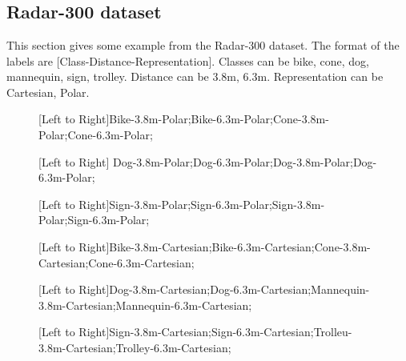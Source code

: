 \chapter{}

\section{Radar-300 dataset}\label{apa}
This section gives some example from the Radar-300 dataset. The format of the labels are [Class-Distance-Representation]. Classes can be {bike, cone, dog, mannequin, sign, trolley}. Distance can be {3.8m, 6.3m}. Representation can be {Cartesian, Polar}.

\begin{figure}[h]
	\centering
	\epsfxsize=7.5cm
	{}{}\caption{[Left to Right]Bike-3.8m-Polar;Bike-6.3m-Polar;Cone-3.8m-Polar;Cone-6.3m-Polar;}
	\label{fig:blocks}
\end{figure} 

\begin{figure}[h]
	\centering
	\epsfxsize=7.5cm
	{}{}\caption{[Left to Right] Dog-3.8m-Polar;Dog-6.3m-Polar;Dog-3.8m-Polar;Dog-6.3m-Polar;} \cite{mnistimage}
	\label{fig:blocks}
\end{figure} 

\begin{figure}[h]
	\centering
	\epsfxsize=7.5cm
	{}{}\caption{[Left to Right]Sign-3.8m-Polar;Sign-6.3m-Polar;Sign-3.8m-Polar;Sign-6.3m-Polar;}
	\label{fig:blocks}
\end{figure} 


\begin{figure}[h]
	\centering
	\epsfxsize=7.5cm
	{}{}\caption{[Left to Right]Bike-3.8m-Cartesian;Bike-6.3m-Cartesian;Cone-3.8m-Cartesian;Cone-6.3m-Cartesian;}
	\label{fig:blocks}
\end{figure} 

\begin{figure}[h]
	\centering
	\epsfxsize=7.5cm
	{}{}\caption{[Left to Right]Dog-3.8m-Cartesian;Dog-6.3m-Cartesian;Mannequin-3.8m-Cartesian;Mannequin-6.3m-Cartesian;}
	\label{fig:blocks}
\end{figure} 

\begin{figure}[h]
	\centering
	\epsfxsize=7.5cm
	{}{}\caption{[Left to Right]Sign-3.8m-Cartesian;Sign-6.3m-Cartesian;Trolleu-3.8m-Cartesian;Trolley-6.3m-Cartesian;}
	\label{fig:blocks}
\end{figure}

